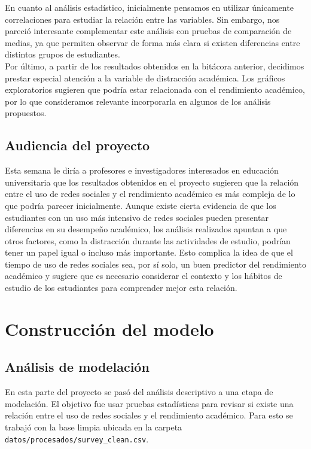 \documentclass[12pt]{article}
\begin{document}
En cuanto al análisis estadístico, inicialmente pensamos en utilizar únicamente correlaciones para estudiar la relación entre las variables. Sin embargo, nos pareció interesante complementar este análisis con pruebas de comparación de medias, ya que permiten observar de forma más clara si existen diferencias entre distintos grupos de estudiantes.
\\

Por último, a partir de los resultados obtenidos en la bitácora anterior, decidimos prestar especial atención a la variable de distracción académica. Los gráficos exploratorios sugieren que podría estar relacionada con el rendimiento académico, por lo que consideramos relevante incorporarla en algunos de los análisis propuestos.


\subsection{Audiencia del proyecto}
Esta semana le diría a profesores e investigadores interesados en educación universitaria que los resultados obtenidos en el proyecto sugieren que la relación entre el uso de redes sociales y el rendimiento académico es más compleja de lo que podría parecer inicialmente. Aunque existe cierta evidencia de que los estudiantes con un uso más intensivo de redes sociales pueden presentar diferencias en su desempeño académico, los análisis realizados apuntan a que otros factores, como la distracción durante las actividades de estudio, podrían tener un papel igual o incluso más importante. Esto complica la idea de que el tiempo de uso de redes sociales sea, por sí solo, un buen predictor del rendimiento académico y sugiere que es necesario considerar el contexto y los hábitos de estudio de los estudiantes para comprender mejor esta relación.


\section{Construcción del modelo}
\subsection{Análisis de modelación}

En esta parte del proyecto se pasó del análisis descriptivo a una etapa de modelación. El objetivo fue usar pruebas estadísticas para revisar si existe una relación entre el uso de redes sociales y el rendimiento académico. Para esto se trabajó con la base limpia ubicada en la carpeta \texttt{datos/procesados/survey\_clean.csv}.
\\
\end{document}
